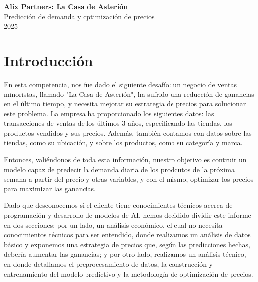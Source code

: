 \documentclass[12pt,a4paper]{article}
\begin{document}
\begin{titlepage}
    \centering
    \vspace*{2cm}
    
    {\Huge \textbf{Alix Partners: La Casa de Asterión}}\\[0.5cm]
    {\Large Predicción de demanda y optimización de precios}\\[1.5cm]
    
    {\Large 2025}\\[2cm]

\end{titlepage}

\tableofcontents
\newpage

\section{Introducción}

En esta competencia, nos fue dado el siguiente desafío: un negocio de ventas minoristas, llamado "La Casa de Asterión", ha sufrido una reducción de ganancias 
en el último tiempo, y necesita mejorar su estrategia de precios para solucionar este problema. La empresa ha proporcionado los siguientes datos: las transacciones 
de ventas de los últimos 3 años, especificando las tiendas, los productos vendidos y sus precios. Además, también contamos con datos sobre las tiendas, como su ubicación, 
y sobre los productos, como su categoría y marca. 

\vspace{0.2cm}

Entonces, valiéndonos de toda esta información, nuestro objetivo es contruir un modelo capaz de predecir la demanda diaria de los prodcutos de la próxima semana a 
partir del precio y otras variables, y con el mismo, optimizar los precios para maximizar las ganancias.

\vspace{0.2cm}

Dado que desconocemos si el cliente tiene conocimientos técnicos acerca de programación y desarrollo de modelos de AI, 
hemos decidido dividir este informe en dos secciones: por un lado, un análisis económico, el cual no necesita conocimientos técnicos para ser entendido, 
donde realizamos un análisis de datos básico y exponemos una estrategia de precios que, según las predicciones hechas, debería aumentar las ganancias; 
y por otro lado, realizamos un análisis técnico, en donde detallamos el preprocesamiento de datos, la construcción y entrenamiento del modelo predictivo 
y la metodología de optimización de precios.
\end{document}
